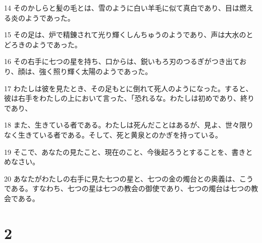 \par 14 そのかしらと髪の毛とは、雪のように白い羊毛に似て真白であり、目は燃える炎のようであった。
\par 15 その足は、炉で精錬されて光り輝くしんちゅうのようであり、声は大水のとどろきのようであった。
\par 16 その右手に七つの星を持ち、口からは、鋭いもろ刃のつるぎがつき出ており、顔は、強く照り輝く太陽のようであった。
\par 17 わたしは彼を見たとき、その足もとに倒れて死人のようになった。すると、彼は右手をわたしの上において言った、「恐れるな。わたしは初めであり、終りであり、
\par 18 また、生きている者である。わたしは死んだことはあるが、見よ、世々限りなく生きている者である。そして、死と黄泉とのかぎを持っている。
\par 19 そこで、あなたの見たこと、現在のこと、今後起ろうとすることを、書きとめなさい。
\par 20 あなたがわたしの右手に見た七つの星と、七つの金の燭台との奥義は、こうである。すなわち、七つの星は七つの教会の御使であり、七つの燭台は七つの教会である。

\chapter{2}

